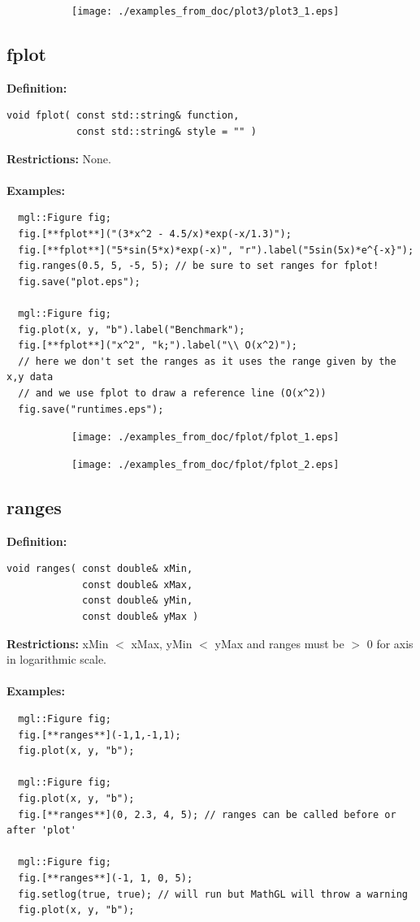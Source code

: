 \documentclass[a4paper]{article}
\newcommand{\command}[1]{\subsection{#1}}
\begin{document}
\begin{figure}[h]
  \centering
  \begin{subfigure}[hb]{0.45\linewidth}
    \texttt{[image: ./examples\_from\_doc/plot3/plot3\_1.eps]}
  \end{subfigure}
\end{figure}
  

\newpage
\command{fplot}

\textbf{Definition:}
\begin{lstlisting}
void fplot( const std::string& function,
            const std::string& style = "" )
\end{lstlisting}
\textbf{Restrictions:} None. \\ \\
%
\textbf{Examples:}
\begin{lstlisting}
  mgl::Figure fig;
  fig.[**fplot**]("(3*x^2 - 4.5/x)*exp(-x/1.3)");
  fig.[**fplot**]("5*sin(5*x)*exp(-x)", "r").label("5sin(5x)*e^{-x}");
  fig.ranges(0.5, 5, -5, 5); // be sure to set ranges for fplot!
  fig.save("plot.eps");

  mgl::Figure fig;
  fig.plot(x, y, "b").label("Benchmark");
  fig.[**fplot**]("x^2", "k;").label("\\ O(x^2)");
  // here we don't set the ranges as it uses the range given by the x,y data
  // and we use fplot to draw a reference line (O(x^2))
  fig.save("runtimes.eps"); 
\end{lstlisting}

\begin{figure}[h]
  \centering
  \begin{subfigure}[hb]{0.32\linewidth}
    \texttt{[image: ./examples\_from\_doc/fplot/fplot\_1.eps]}
  \end{subfigure}
  \hspace{2cm}
  \begin{subfigure}[hb]{0.32\linewidth}
    \texttt{[image: ./examples\_from\_doc/fplot/fplot\_2.eps]}
  \end{subfigure}
\end{figure}

\command{ranges}

\textbf{Definition:}
\begin{lstlisting}
void ranges( const double& xMin, 
             const double& xMax, 
             const double& yMin, 
             const double& yMax )
\end{lstlisting}
%
\textbf{Restrictions:} xMin $<$ xMax, yMin $<$ yMax and ranges must be $>$ 0 for axis in logarithmic scale. \\ \\
%
\textbf{Examples:}
\begin{lstlisting}
  mgl::Figure fig;
  fig.[**ranges**](-1,1,-1,1);
  fig.plot(x, y, "b");

  mgl::Figure fig;
  fig.plot(x, y, "b");
  fig.[**ranges**](0, 2.3, 4, 5); // ranges can be called before or after 'plot'

  mgl::Figure fig;
  fig.[**ranges**](-1, 1, 0, 5);
  fig.setlog(true, true); // will run but MathGL will throw a warning 
  fig.plot(x, y, "b");
\end{lstlisting}
\end{document}
